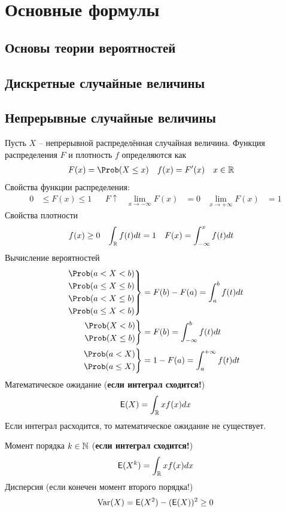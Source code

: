 
\section{Основные формулы}

\subsection{Основы теории вероятностей}

\subsection{Дискретные случайные величины}

\subsection{Непрерывные случайные величины}

Пусть \(X\) -- непрерывной распределённая случайная величина. Функция распределения \(F\) и плотность \(f\)
определяются как
\begin{align*}
	F(x)&=\Prob(X\leq x) & f(x)&=F'(x) & x&\in\R
\end{align*}
Свойства функции распределения:
\begin{align*}
	0&\leq F(x)\leq1 & &F \uparrow & 
	\lim_{x\to-\infty}F(x)&=0 & \lim_{x\to+\infty}F(x)&=1
\end{align*}
Свойства плотности
\begin{align*}
	f(x)&\geq 0 & \int_{\mathbb R} f(t)dt&=1 & F(x)&=\int_{-\infty}^x f(t)dt
\end{align*}
Вычисление вероятностей
\begin{align*}
	\left.\begin{aligned}
	&\Prob(a<X<b) \\ & \Prob(a\leq X\leq b) \\ 
	& \Prob(a<X\leq b) \\ &\Prob(a\leq X< b)
	\end{aligned}
	\right\}&=F(b)-F(a)=\int_a^b f(t)dt\\
	\left.\begin{aligned}
	&\Prob(X<b) \\ & \Prob(X\leq b)
	\end{aligned}
	\right\}&=F(b)=\int_{-\infty}^b f(t)dt\\
	\left.\begin{aligned}
	&\Prob(a<X) \\ & \Prob(a\leq X)
	\end{aligned}
	\right\}&=1-F(a)=\int_{a}^{+\infty} f(t)dt
\end{align*}
Математическое ожидание (\textbf{если интеграл сходится!})
\[
	{\mathsf E}(X)=\int_{\mathbb R} xf(x)dx
\]
Если интеграл расходится, то математическое ожидание не существует.

Момент порядка \(k\in\mathbb N\)  (\textbf{если интеграл сходится!})
\[
	{\mathsf E}(X^k)=\int_{\mathbb R} xf(x)dx
\]
Дисперсия (если конечен момент второго порядка!)
\[
	\operatorname{Var}(X)={\mathsf E}(X^2)-({\mathsf E}(X))^2\geq0
\]